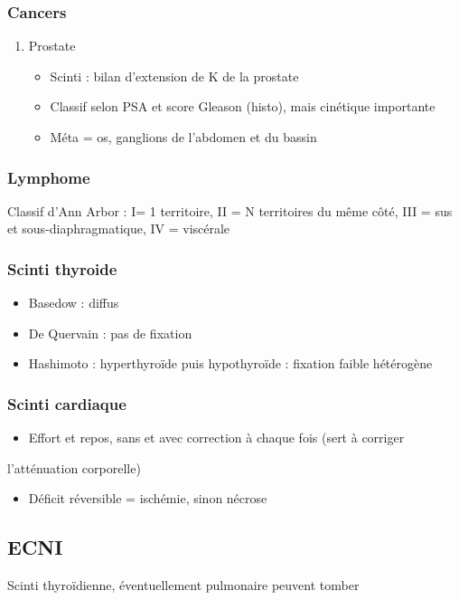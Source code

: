 \documentclass[11pt]{article}
\begin{document}
\subsubsection{Cancers}
\label{sec:orgb91803d}
\begin{enumerate}
\item Prostate
\label{sec:org0df22a4}
\begin{itemize}
\item Scinti : bilan d'extension de K de la prostate
\item Classif selon PSA et score Gleason (histo), mais cinétique importante
\item Méta  = os, ganglions de l'abdomen et du bassin
\end{itemize}
\end{enumerate}
\subsubsection{Lymphome}
\label{sec:org50f625d}
Classif d'Ann Arbor : I= 1 territoire, II = N territoires du même côté, III =
sus et sous-diaphragmatique, IV = viscérale
\subsubsection{Scinti thyroide}
\label{sec:org5332196}
\begin{itemize}
\item Basedow : diffus
\item De Quervain : pas de fixation
\item Hashimoto : hyperthyroïde puis hypothyroïde : fixation faible hétérogène
\end{itemize}
\subsubsection{Scinti cardiaque}
\label{sec:org8953eba}
\begin{itemize}
\item Effort et repos, sans et avec correction à chaque fois (sert à corriger
\end{itemize}
l'atténuation corporelle)
\begin{itemize}
\item Déficit réversible = ischémie, sinon nécrose
\end{itemize}
\subsection{ECNI}
\label{sec:orgadaf12c}
Scinti thyroïdienne, éventuellement pulmonaire peuvent tomber
\end{document}
